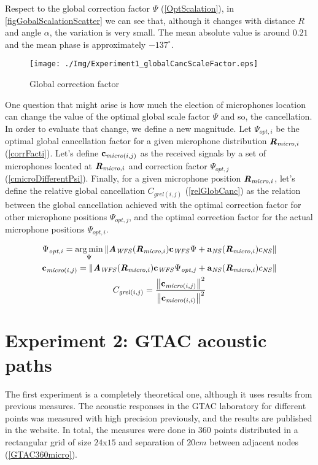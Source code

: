 Respect to the global correction factor $\Psi$ (\autoref{OptScalation}), in \autoref{figGobalScalationScatter} we can see that, although it changes with distance $R$ and angle $\alpha$, the variation is very small. The mean absolute value is around $0.21$ and the mean phase is approximately $-137^\circ$. 

\begin{figure}
	\centering
	\texttt{[image: ./Img/Experiment1\_globalCancScaleFactor.eps]}
	\caption[Global correction factor]{Global correction factor}
	\label{figGobalScalationScatter}
\end{figure}

One question that might arise is how much the election of microphones location can change the value of the optimal global scale factor $\Psi$ and so, the cancellation. In order to evaluate that change, we define a new magnitude. Let $\Psi_{\mathit{opt}, i}$ be the optimal global cancellation factor for a given microphone distribution $\pos[matMicro]{,i}$ (\autoref{corrFacti}). Let's define $\cmicro[(i,j)]$ as the received signals by a set of microphones located at $\pos[matMicro]{,i}$ and correction factor $\Psi_{\mathit{opt}, j}$ (\autoref{cmicroDifferentPsi}). Finally, for a given microphone position $\pos[matMicro]{,i}$, let's define the relative global cancellation $C_{\mathit{grel}(i,j)}$ (\autoref{relGlobCanc}) as the relation between the global cancellation achieved with the optimal correction factor for other microphone positions $\Psi_{\mathit{opt}, j}$, and the optimal correction factor for the actual microphone positions $\Psi_{\mathit{opt}, i}$.

\begin{gather}
\Psi_{\mathit{opt}, i} = \argmin_{\Psi} \norm{\Awfs(\pos[matMicro]{,i})\cwfs \Psi + \vec{a}_{\mathit{NS}}(\pos[matMicro]{,i}) \cnsScalar} \label{corrFacti} \\
\cmicro[(i,j)] = \norm{\Awfs(\pos[matMicro]{,i})\cwfs \Psi_{\mathit{opt}, j} + \vec{a}_{\mathit{NS}}(\pos[matMicro]{,i}) \cnsScalar} \label{cmicroDifferentPsi} \\
C_{\mathit{grel}(i,j)} = \frac{\norm{\cmicro[(i,j)]}^2}{\norm{\cmicro[(i,i)]}^2} \label{relGlobCanc}
\end{gather}

\section{Experiment 2: GTAC acoustic paths}
The first experiment is a completely theoretical one, although it uses results from previous measures. The acoustic responses in the GTAC laboratory for different points was measured with high precision previously, and the results are published in the website. In total, the measures were done in 360 points distributed in a rectangular grid of size $24$x$15$ and separation of $20 \si{cm}$ between adjacent nodes (\autoref{GTAC360micro}).

